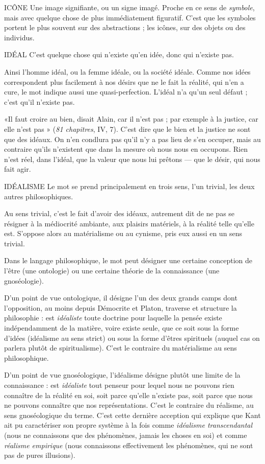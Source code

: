 ICÔNE Une image signifiante, ou un signe imagé. Proche en ce sens de {\it symbole},
mais avec quelque chose de plus immédiatement figuratif.
C’est que les symboles portent le plus souvent sur des abstractions ; les icônes,
sur des objets ou des individus.

IDÉAL C’est quelque chose qui n’existe qu’en idée, donc qui n’existe pas.

Ainsi l’homme idéal, ou la femme idéale, ou la société idéale.
Comme nos idées correspondent plus facilement à nos désirs que ne le fait la
réalité, qui n’en a cure, le mot indique aussi une quasi-perfection. L’idéal n’a
qu’un seul défaut ; c’est qu’il n'existe pas.

«Il faut croire au bien, disait Alain, car il n’est pas ; par exemple à la justice, car
elle n’est pas » ({\it 81 chapitres}, IV, 7). C’est dire que le bien et la justice ne sont que
des idéaux. On n’en condlura pas qu’il n’y a pas lieu de s’en occuper, mais au
contraire qu'ils n'existent que dans la mesure où nous nous en occupons. Rien n'est
réel, dans l'idéal, que la valeur que nous lui prêtons — que le désir, qui nous fait agir.

IDÉALISME Le mot se prend principalement en trois sens, l’un trivial, les
deux autres philosophiques.

Au sens trivial, c’est le fait d’avoir des idéaux, autrement dit de ne pas se résigner
à la médiocrité ambiante, aux plaisirs matériels, à la réalité telle qu’elle est.
S’oppose alors au matérialisme ou au cynisme, pris eux aussi en un sens trivial.

Dans le langage philosophique, le mot peut désigner une certaine conception
de l’être (une ontologie) ou une certaine théorie de la connaissance (une
gnoséologie).

D'un point de vue ontologique, il désigne l’un des deux grands camps dont
l'opposition, au moins depuis Démocrite et Platon, traverse et structure la
philosophie : est {\it idéaliste} toute doctrine pour laquelle la pensée existe indépendamment
de la matière, voire existe seule, que ce soit sous la forme d’idées
(idéalisme au sens strict) ou sous la forme d’êtres spirituels (auquel cas on parlera
plutôt de spiritualisme). C’est le contraire du matérialisme au sens philosophique.

D'un point de vue gnoséologique, l’idéalisme désigne plutôt une limite de
la connaissance : est {\it idéaliste} tout penseur pour lequel nous ne pouvons rien
connaître de la réalité en soi, soit parce qu’elle n’existe pas, soit parce que nous
ne pouvons connaître que nos représentations. C’est le contraire du réalisme,
au sens gnoséologique du terme. C’est cette dernière acception qui explique
que Kant ait pu caractériser son propre système à la fois comme {\it idéalisme transcendantal}
(nous ne connaissons que des phénomènes, jamais les choses en soi)
et comme {\it réalisme empirique} (nous connaissons effectivement les phénomènes,
qui ne sont pas de pures illusions).

